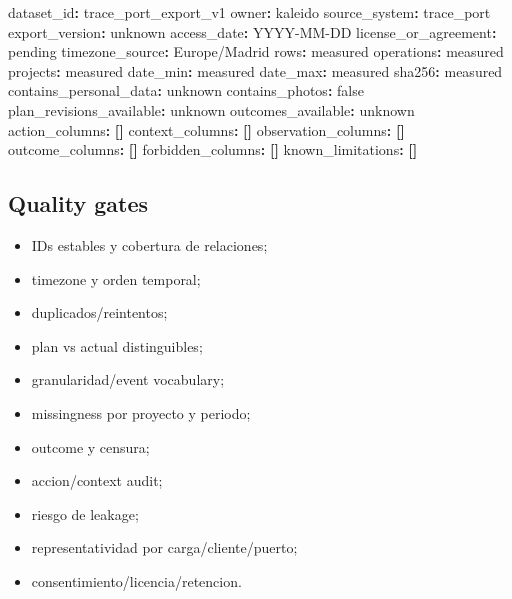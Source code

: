 \documentclass[
  spanish,
  10pt,
  a4paper,
]{article}
\newenvironment{Shaded}{}{}
\newcommand{\AttributeTok}[1]{\textcolor[rgb]{0.49,0.56,0.16}{#1}}
\newcommand{\CharTok}[1]{\textcolor[rgb]{0.25,0.44,0.63}{#1}}
\newcommand{\FunctionTok}[1]{\textcolor[rgb]{0.02,0.16,0.49}{#1}}
\newcommand{\KeywordTok}[1]{\textcolor[rgb]{0.00,0.44,0.13}{\textbf{#1}}}
\providecommand{\tightlist}{%
  \setlength{\itemsep}{0pt}\setlength{\parskip}{0pt}}
\begin{document}
\begin{Shaded}
\begin{Highlighting}[]
\FunctionTok{dataset\_id}\KeywordTok{:}\AttributeTok{ trace\_port\_export\_v1}
\FunctionTok{owner}\KeywordTok{:}\AttributeTok{ kaleido}
\FunctionTok{source\_system}\KeywordTok{:}\AttributeTok{ trace\_port}
\FunctionTok{export\_version}\KeywordTok{:}\AttributeTok{ unknown}
\FunctionTok{access\_date}\KeywordTok{:}\AttributeTok{ YYYY{-}MM{-}DD}
\FunctionTok{license\_or\_agreement}\KeywordTok{:}\AttributeTok{ pending}
\FunctionTok{timezone\_source}\KeywordTok{:}\AttributeTok{ Europe/Madrid}
\FunctionTok{rows}\KeywordTok{:}\AttributeTok{ measured}
\FunctionTok{operations}\KeywordTok{:}\AttributeTok{ measured}
\FunctionTok{projects}\KeywordTok{:}\AttributeTok{ measured}
\FunctionTok{date\_min}\KeywordTok{:}\AttributeTok{ measured}
\FunctionTok{date\_max}\KeywordTok{:}\AttributeTok{ measured}
\FunctionTok{sha256}\KeywordTok{:}\AttributeTok{ measured}
\FunctionTok{contains\_personal\_data}\KeywordTok{:}\AttributeTok{ unknown}
\FunctionTok{contains\_photos}\KeywordTok{:}\AttributeTok{ }\CharTok{false}
\FunctionTok{plan\_revisions\_available}\KeywordTok{:}\AttributeTok{ unknown}
\FunctionTok{outcomes\_available}\KeywordTok{:}\AttributeTok{ unknown}
\FunctionTok{action\_columns}\KeywordTok{:}\AttributeTok{ }\KeywordTok{[]}
\FunctionTok{context\_columns}\KeywordTok{:}\AttributeTok{ }\KeywordTok{[]}
\FunctionTok{observation\_columns}\KeywordTok{:}\AttributeTok{ }\KeywordTok{[]}
\FunctionTok{outcome\_columns}\KeywordTok{:}\AttributeTok{ }\KeywordTok{[]}
\FunctionTok{forbidden\_columns}\KeywordTok{:}\AttributeTok{ }\KeywordTok{[]}
\FunctionTok{known\_limitations}\KeywordTok{:}\AttributeTok{ }\KeywordTok{[]}
\end{Highlighting}
\end{Shaded}

\subsection{Quality gates}\label{quality-gates}

\begin{itemize}
\tightlist
\item
  IDs estables y cobertura de relaciones;
\item
  timezone y orden temporal;
\item
  duplicados/reintentos;
\item
  plan vs actual distinguibles;
\item
  granularidad/event vocabulary;
\item
  missingness por proyecto y periodo;
\item
  outcome y censura;
\item
  accion/context audit;
\item
  riesgo de leakage;
\item
  representatividad por carga/cliente/puerto;
\item
  consentimiento/licencia/retencion.
\end{itemize}
\end{document}
